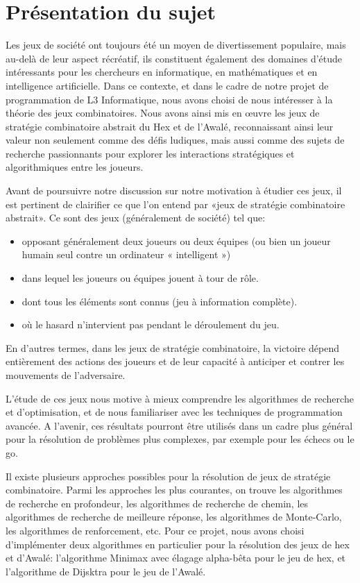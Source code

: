 \section{Présentation du sujet}
Les jeux de société ont toujours été un moyen de divertissement populaire, mais au-delà 
de leur aspect récréatif, ils constituent également des domaines d'étude intéressants pour les 
chercheurs en informatique, en mathématiques et en intelligence artificielle. 
Dans ce contexte, et dans le cadre de notre projet de programmation de L3 Informatique, 
nous avons choisi de nous intéresser à la théorie des jeux combinatoires. Nous avons ainsi mis 
en œuvre les jeux de stratégie combinatoire abstrait du Hex et de l'Awalé, reconnaissant ainsi 
leur valeur non seulement comme des défis ludiques, mais aussi comme des sujets de recherche 
passionnants pour explorer les interactions stratégiques et algorithmiques entre les joueurs.

Avant de poursuivre notre discussion sur notre motivation à étudier ces jeux, il est pertinent
de clairifier ce que l'on entend par «jeux de stratégie combinatoire abstrait». Ce sont des jeux 
(généralement de société) tel que:
\begin{itemize}
	\item opposant généralement deux joueurs ou deux équipes (ou bien un joueur humain seul 
	contre un ordinateur « intelligent »)
	\item dans lequel les joueurs ou équipes jouent à tour de rôle.
	\item dont tous les éléments sont connus (jeu à information complète).
	\item où le hasard n'intervient pas pendant le déroulement du jeu.
\end{itemize}
En d'autres termes, dans les jeux de stratégie combinatoire, la victoire dépend entièrement 
des actions des joueurs et de leur capacité à anticiper et contrer les mouvements de l'adversaire. 


L'étude de ces jeux nous motive à mieux comprendre les algorithmes de 
recherche et d'optimisation, et de nous familiariser avec les techniques de 
programmation avancée. A l'avenir, ces résultats pourront être utilisés dans
un cadre plus général pour la résolution de problèmes plus complexes, par exemple
pour les échecs ou le go. 


Il existe plusieurs approches possibles pour la résolution de jeux de stratégie
combinatoire. Parmi les approches les plus courantes, on trouve les algorithmes
de recherche en profondeur, les algorithmes de recherche de chemin, les
algorithmes de recherche de meilleure réponse, les algorithmes de Monte-Carlo,
les algorithmes de renforcement, etc.
Pour ce projet, nous avons choisi d'implémenter deux algorithmes en particulier
pour la résolution des jeux de hex et d'Awalé: l'algorithme Minimax avec élagage
alpha-bêta pour le jeu de hex, et l'algorithme de Dijsktra pour le jeu de l'Awalé.

